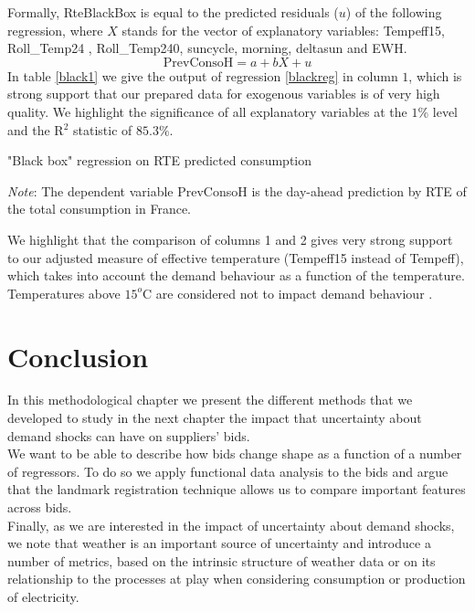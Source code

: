 Formally, RteBlackBox is equal to the predicted residuals ($u$) of the following regression, where $X$ stands for the vector of explanatory variables: Tempeff15,  Roll\_Temp24 ,  Roll\_Temp240, suncycle, morning, deltasun and EWH.  \\
\begin{equation}
\label{blackreg}
 \text{PrevConsoH} = a + bX +u 
\end{equation}
In table \ref{black1} we give the output of regression \ref{blackreg} in column $1$, which is strong support that our prepared data for exogenous variables is of very high quality. We highlight the significance of all explanatory variables at the $1\%$ level and the R$^2$ statistic of $85.3\%$. \\

\begin{table}[!ht]

\caption{\label{black1} "Black box" regression on RTE predicted consumption}
\emph{Note}: The dependent variable PrevConsoH is the day-ahead prediction by RTE of the total consumption in France. 
\end{table}

We highlight that the comparison of columns 1 and 2 gives very strong support to our adjusted measure of effective temperature (Tempeff15 instead of Tempeff), which takes into account the demand behaviour as a function of the temperature. Temperatures above $15^o$C are considered not to impact demand behaviour \cite{rtewebsite1}.

\section{Conclusion}

In this methodological chapter we present the different methods that we developed to study in the next chapter the impact that uncertainty about demand shocks can have on suppliers' bids. \\

We want to be able to describe how bids change shape as a function of a number of regressors. To do so we apply functional data analysis to the bids and argue that the landmark registration technique allows us to compare important features across bids. \\

Finally, as we are interested in the impact of uncertainty about demand shocks, we note that weather is an important source of uncertainty and introduce a number of metrics, based on the intrinsic structure of weather data or on its relationship to the processes at play when considering consumption or production of electricity. \\

